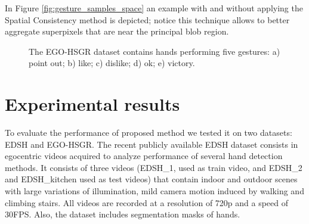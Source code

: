 In Figure \ref{fig:gesture_samples_space} an example with and without applying the Spatial Consistency method is depicted; notice this technique allows to better aggregate superpixels that are near the principal blob region.


\begin{figure}[tb]
\centering
{}
\caption{The EGO-HSGR dataset contains hands performing five gestures: a) point out; b) like; c) dislike; d) ok; e) victory.}
\label{fig:gesture_samples}
\end{figure}

\section{Experimental results}
To evaluate the performance of proposed method we tested it on two datasets: EDSH and EGO-HSGR.
The recent publicly available EDSH dataset \cite{li13} consists in egocentric videos acquired to analyze performance of several hand detection methods. It consists of three videos (EDSH\_1, used as train video, and EDSH\_2 and EDSH\_{kitchen} used as test videos) that contain indoor and outdoor scenes with large variations of illumination, mild camera motion induced by walking and climbing stairs. All videos are recorded at a resolution of 720p and a speed of 30FPS. Also, the dataset includes segmentation masks of hands.    

